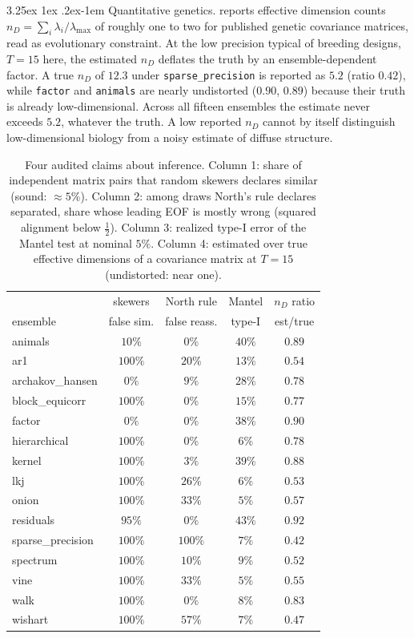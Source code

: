 \documentclass[11pt]{article}
\makeatletter
\renewcommand\paragraph{\@startsection{paragraph}{4}{\z@}%
  {3.25ex \@plus1ex \@minus.2ex}{-1em}%
  {\normalfont\normalsize\itshape}}
\renewcommand\paragraph{\@startsection{paragraph}{4}{\z@}%
  {3.25ex \@plus1ex \@minus.2ex}{-1em}%
  {\normalfont\normalsize\itshape}}
\makeatother
\begin{document}
\paragraph{Quantitative genetics.} \citet{kirkpatrick2009} reports effective
dimension counts $n_D=\sum_i\lambda_i/\lambda_{\max}$ of roughly one to
two for published genetic covariance matrices, read as evolutionary
constraint. At the low precision typical of breeding designs, $T=15$
here, the estimated $n_D$ deflates the truth by an ensemble-dependent
factor. A true $n_D$ of $12.3$ under \texttt{sparse\_precision} is
reported as $5.2$ (ratio $0.42$), while \texttt{factor} and
\texttt{animals} are nearly undistorted ($0.90$, $0.89$) because their
truth is already low-dimensional. Across all fifteen ensembles the
estimate never exceeds $5.2$, whatever the truth. A low reported $n_D$ cannot by
itself distinguish low-dimensional biology from a noisy estimate of
diffuse structure.

\begin{table}[t]
\centering\small
\begin{tabular}{lcccc}
\toprule
 & skewers & North rule & Mantel & $n_D$ ratio \\
ensemble & false sim. & false reass. & type-I & est/true \\
\midrule
animals & $10\%$ & $0\%$ & $40\%$ & $0.89$ \\
ar1 & $100\%$ & $20\%$ & $13\%$ & $0.54$ \\
archakov\_hansen & $0\%$ & $9\%$ & $28\%$ & $0.78$ \\
block\_equicorr & $100\%$ & $0\%$ & $15\%$ & $0.77$ \\
factor & $0\%$ & $0\%$ & $38\%$ & $0.90$ \\
hierarchical & $100\%$ & $0\%$ & $6\%$ & $0.78$ \\
kernel & $100\%$ & $3\%$ & $39\%$ & $0.88$ \\
lkj & $100\%$ & $26\%$ & $6\%$ & $0.53$ \\
onion & $100\%$ & $33\%$ & $5\%$ & $0.57$ \\
residuals & $95\%$ & $0\%$ & $43\%$ & $0.92$ \\
sparse\_precision & $100\%$ & $100\%$ & $7\%$ & $0.42$ \\
spectrum & $100\%$ & $10\%$ & $9\%$ & $0.52$ \\
vine & $100\%$ & $33\%$ & $5\%$ & $0.55$ \\
walk & $100\%$ & $0\%$ & $8\%$ & $0.83$ \\
wishart & $100\%$ & $57\%$ & $7\%$ & $0.47$ \\
\bottomrule
\end{tabular}
\caption{Four audited claims about inference. Column 1: share of
independent matrix pairs that random skewers declares similar (sound:
$\approx 5\%$). Column 2: among draws North's rule declares separated,
share whose leading EOF is mostly wrong (squared alignment below
$\tfrac12$). Column 3: realized type-I error of the Mantel test at
nominal $5\%$. Column 4: estimated over true effective dimensions of a
covariance matrix at $T=15$ (undistorted: near one).}\label{tab:rates}
\end{table}
\end{document}
